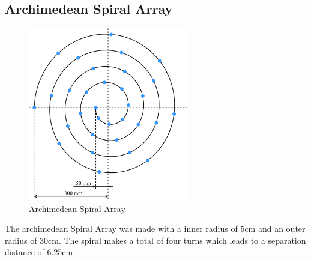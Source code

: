 \subsection{Archimedean Spiral Array}
\begin{minipage}{\linewidth}
	\begin{figure}
		\vspace{-0.8cm}
		\includegraphics[width=7cm]{images/5_array_evaluation/prototype_array_archimedian_spiral.pdf}
		\centering
		\caption{Archimedean Spiral Array}
		\label{fig:prototype_array_archimedian_spiral}
	\end{figure}
	The archimedean Spiral Array was made with a inner radius of 5cm and an outer radius of 
	30cm. The spiral makes a total of four turns which leads to a 
	separation distance of 6.25cm.

\end{minipage}
\newpage


